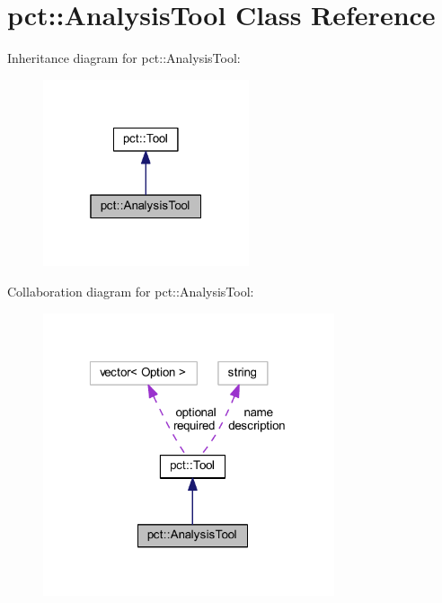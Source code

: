 \hypertarget{classpct_1_1_analysis_tool}{\section{pct\-:\-:Analysis\-Tool Class Reference}
\label{classpct_1_1_analysis_tool}
}


Inheritance diagram for pct\-:\-:Analysis\-Tool\-:\nopagebreak
\begin{figure}[H]
\begin{center}
\leavevmode
\includegraphics[width=172pt]{classpct_1_1_analysis_tool__inherit__graph}
\end{center}
\end{figure}


Collaboration diagram for pct\-:\-:Analysis\-Tool\-:\nopagebreak
\begin{figure}[H]
\begin{center}
\leavevmode
\includegraphics[width=243pt]{classpct_1_1_analysis_tool__coll__graph}
\end{center}
\end{figure}
